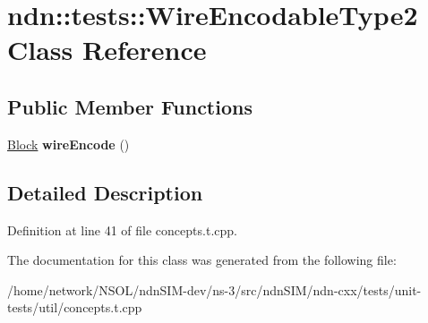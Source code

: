 \hypertarget{classndn_1_1tests_1_1WireEncodableType2}{}\section{ndn\+:\+:tests\+:\+:Wire\+Encodable\+Type2 Class Reference}
\label{classndn_1_1tests_1_1WireEncodableType2}
\subsection*{Public Member Functions}
\begin{DoxyCompactItemize}
\item 
\hyperlink{classndn_1_1Block}{Block} {\bfseries wire\+Encode} ()\hypertarget{classndn_1_1tests_1_1WireEncodableType2_a974faa581ab7f3dc7fd9bf7370cc0989}{}\label{classndn_1_1tests_1_1WireEncodableType2_a974faa581ab7f3dc7fd9bf7370cc0989}

\end{DoxyCompactItemize}


\subsection{Detailed Description}


Definition at line 41 of file concepts.\+t.\+cpp.



The documentation for this class was generated from the following file\+:\begin{DoxyCompactItemize}
\item 
/home/network/\+N\+S\+O\+L/ndn\+S\+I\+M-\/dev/ns-\/3/src/ndn\+S\+I\+M/ndn-\/cxx/tests/unit-\/tests/util/concepts.\+t.\+cpp\end{DoxyCompactItemize}
